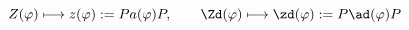 \begin{equation}
  Z(\varphi) \longmapsto z(\varphi):=Pa(\varphi)P,\qquad \Zd(\varphi) \longmapsto \zd(\varphi):=P\ad(\varphi)P    
  \end{equation}

